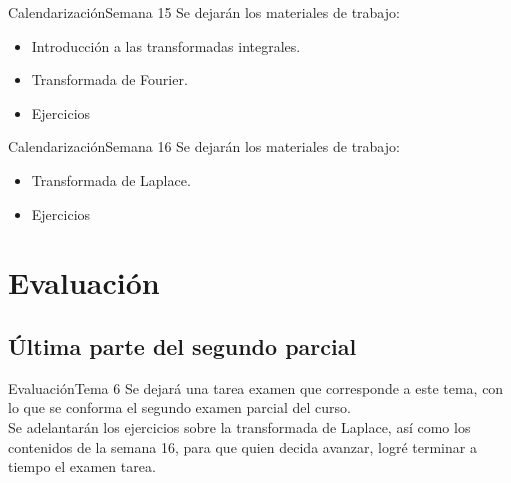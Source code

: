 \documentclass[10pt]{beamer}
\begin{document}
\begin{frame}{Calendarización}{Semana 15}
Se dejarán los materiales de trabajo:
\begin{itemize}
\item Introducción a las transformadas integrales.
\item Transformada de Fourier.
\item Ejercicios
\end{itemize}
\end{frame}

\begin{frame}{Calendarización}{Semana 16}
Se dejarán los materiales de trabajo:
\begin{itemize}
\item Transformada de Laplace.
\item Ejercicios
\end{itemize}
\end{frame}

\section{Evaluación}

\subsection{Última parte del segundo parcial}
\begin{frame}{Evaluación}{Tema 6}
Se dejará una tarea examen que corresponde a este tema, con lo que se conforma el segundo examen parcial del curso.
\\
\bigskip
\pause
Se adelantarán los ejercicios sobre la transformada de Laplace, así como los contenidos de la semana 16, para que quien decida avanzar, logré terminar a tiempo el examen tarea.
\end{frame}

\end{document}
